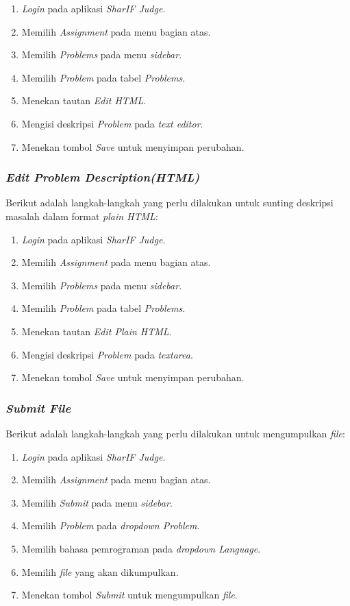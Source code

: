 \begin{enumerate}
	\item \textit{Login} pada aplikasi \textit{SharIF Judge}.
	\item Memilih \textit{Assignment} pada menu bagian atas.
	\item Memilih \textit{Problems} pada menu \textit{sidebar}.
	\item Memilih \textit{Problem} pada tabel \textit{Problems}.
	\item Menekan tautan \textit{Edit HTML}.
	\item Mengisi deskripsi \textit{Problem} pada \textit{text editor}.
	\item Menekan tombol \textit{Save} untuk menyimpan perubahan.
\end{enumerate}

\subsubsection{\textit{Edit Problem Description(HTML)}}
\label{subsubsec:skenario_edit_problem_description_plain_html}
Berikut adalah langkah-langkah yang perlu dilakukan untuk sunting deskripsi masalah dalam format \textit{plain HTML}:

\begin{enumerate}
	\item \textit{Login} pada aplikasi \textit{SharIF Judge}.
	\item Memilih \textit{Assignment} pada menu bagian atas.
	\item Memilih \textit{Problems} pada menu \textit{sidebar}.
	\item Memilih \textit{Problem} pada tabel \textit{Problems}.
	\item Menekan tautan \textit{Edit Plain HTML}.
	\item Mengisi deskripsi \textit{Problem} pada \textit{textarea}.
	\item Menekan tombol \textit{Save} untuk menyimpan perubahan.
\end{enumerate}

\subsubsection{\textit{Submit File}}
\label{subsubsec:skenario_submit}
Berikut adalah langkah-langkah yang perlu dilakukan untuk mengumpulkan \textit{file}:

\begin{enumerate}
	\item \textit{Login} pada aplikasi \textit{SharIF Judge}.
	\item Memilih \textit{Assignment} pada menu bagian atas.
	\item Memilih \textit{Submit} pada menu \textit{sidebar}.
	\item Memilih \textit{Problem} pada \textit{dropdown Problem}.
	\item Memilih bahasa pemrograman pada \textit{dropdown Language}.
	\item Memilih \textit{file} yang akan dikumpulkan.
	\item Menekan tombol \textit{Submit} untuk mengumpulkan \textit{file}.
\end{enumerate}

